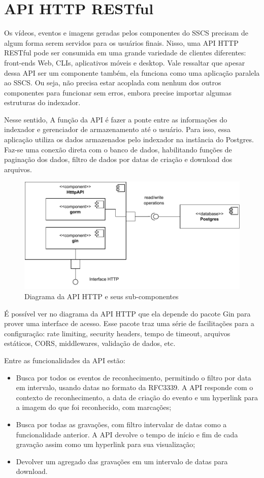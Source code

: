 \documentclass[12pt, %
openright, 
oneside, %
a4paper,    %
brazil]{facom-ufu-abntex2}
\begin{document}
\section{API HTTP RESTful}

Os vídeos, eventos e imagens geradas pelos componentes do SSCS precisam de
algum forma serem servidos para os usuários finais. Nisso, uma API HTTP RESTful
pode ser consumida em uma grande variedade de clientes diferentes: front-ends
Web, CLIs, aplicativos móveis e desktop. Vale ressaltar que apesar dessa API
ser um componente também, ela funciona como uma aplicação paralela ao SSCS. Ou
seja, não precisa estar acoplada com nenhum dos outros componentes para
funcionar sem erros, embora precise importar algumas estruturas do indexador.

Nesse sentido, A função da API é fazer a ponte entre as informações do
indexador e gerenciador  de armazenamento até o usuário. Para isso, essa
aplicação utiliza os dados armazenados pelo indexador na instância do Postgres.
Faz-se uma conexão direta com o banco de dados, habilitando funções de
paginação dos dados, filtro de dados por datas de criação e download dos
arquivos.

\begin{figure}[!ht]
	\centering
	\includegraphics[width=0.8\linewidth]{api_http.pdf}
	\caption[Diagrama da implementação da API HTTP]{Diagrama da API HTTP e
		seus sub-componentes}
	\label{fig:graficosVariandoTamanhoRede}
\end{figure}

É possível ver no diagrama da API HTTP que ela depende do pacote Gin para
prover uma interface de acesso. Esse pacote traz uma série de facilitações para
a configuração: rate limiting, security headers, tempo de timeout, arquivos
estáticos, CORS, middlewares, validação de dados, etc.

Entre as funcionalidades da API estão:

\begin{itemize}
	\item Busca por todos os eventos de reconhecimento, permitindo o filtro
	      por data em intervalo, usando datas no formato da RFC3339. A API responde com o
	      contexto de reconhecimento, a data de criação do evento e um hyperlink para a
	      imagem do que foi reconhecido, com marcações;
	\item Busca por todas as gravações, com filtro intervalar de datas como
	      a funcionalidade anterior. A API devolve o tempo de início e fim de cada
	      gravação assim como um hyperlink para sua visualização;
	\item Devolver um agregado das gravações em um intervalo de datas para
	      download.
\end{itemize}
\end{document}
